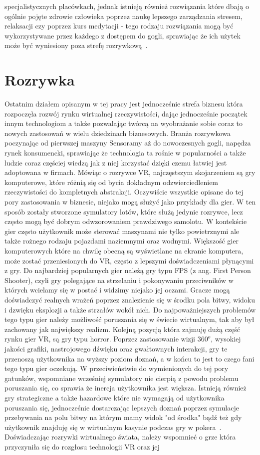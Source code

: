 specjalistycznych placówkach, jednak istnieją również rozwiązania które dbają o ogólnie pojęte zdrowie człowieka poprzez naukę lepszego zarządzania stresem, relaksacji czy poprzez kurs medytacji - tego rodzaju rozwiązania mogą być wykorzystywane przez każdego z dostępem do gogli, sprawiając że ich użytek może być wyniesiony poza strefę rozrywkową~\cite{medycyna}.

\section{Rozrywka}
\label{sec:gry}
	Ostatnim działem opisanym w tej pracy jest jednocześnie strefa biznesu która rozpoczęła rozwój rynku wirtualnej rzeczywistości, dając jednocześnie początek innym technologiom a także pozwalając twórcą na wyobrażanie sobie coraz to nowych zastosowań w wielu dziedzinach biznesowych. Branża rozrywkowa poczynając od pierwszej maszyny Sensoramy aż do nowoczesnych gogli, napędza rynek konsumencki, sprawiając że technologia ta rośnie w popularności a także ludzie coraz częściej wiedzą jak z niej korzystać dzięki czemu łatwiej jest adoptowana w firmach. Mówiąc o rozrywce VR, najczęstszym skojarzeniem są gry komputerowe, które różnią się od bycia dokładnym odzwierciedleniem rzeczywistości do kompletnych abstrakcji. Oczywiście wszystkie opisane do tej pory zastosowania w biznesie, niejako mogą służyć jako przykłady dla gier. W ten sposób zostały stworzone symulatory lotów, które służą jedynie rozrywce, lecz często mogą być dobrym odwzorowaniem prawdziwego samolotu. W kontekście gier często użytkownik może sterować maszynami nie tylko powietrznymi ale także rożnego rodzaju pojazdami naziemnymi oraz wodnymi. Większość gier komputerowych które na chwilę obecną są wyświetlane na ekranie komputera, może zostać przeniesionych do VR, często z lepszymi doświadczeniami płynącymi z gry. Do najbardziej popularnych gier należą gry typu FPS (z ang. First Person Shooter), czyli gry polegające na strzelaniu i pokonywaniu przeciwników w których wcielamy się w postać i widzimy niejako jej oczami. Gracze mogą doświadczyć realnych wrażeń poprzez znalezienie się w środku pola bitwy, widoku i dzwięku eksplozji a także strzałów wokół nich. Do najpoważniejszych problemów tego typu gier należy możliwość poruszania się w świecie wirtualnym, tak aby był zachowany jak największy realizm. Kolejną pozycją która zajmuję dużą część rynku gier VR, są gry typu horror. Poprzez zastosowanie wizji $360^o$, wysokiej jakości grafiki, nastrojowego dźwięku oraz gwałtownych interakcji, gry te przenoszą użytkownika na wyższy poziom doznań, a w końcu to jest to czego fani tego typu gier oczekują. W przeciwieństwie do wymienionych do tej pory gatunków, wspomniane wcześniej symulatory nie cierpią z powodu problemu poruszania się, co sprawia że inercja użytkownika jest większa. Istnieją również gry strategiczne a także hazardowe które nie wymagają od użytkownika poruszania się, jednocześnie dostarczając lepszych doznań poprzez symulacje przebywania na polu bitwy na którym mamy widok "od środka" bądź też gdy użytkownik znajduję się w wirtualnym kasynie podczas gry w pokera~\cite{gry1}. Doświadczając rozrywki wirtualnego świata, należy wspomnieć o grze która przyczyniła się do rozgłosu technologii VR oraz jej 